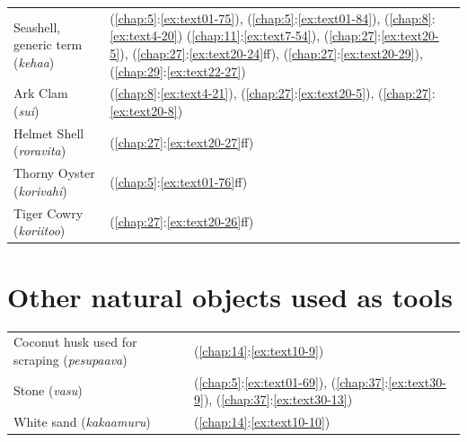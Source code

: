 \begin{tabularx}{\textwidth}{p{7cm}X}
    Seashell, generic term (\textit{kehaa})&(\ref{chap:5}:\ref{ex:text01-75}), (\ref{chap:5}:\ref{ex:text01-84}), (\ref{chap:8}:\ref{ex:text4-20}) (\ref{chap:11}:\ref{ex:text7-54}), (\ref{chap:27}:\ref{ex:text20-5}), (\ref{chap:27}:\ref{ex:text20-24}ff), (\ref{chap:27}:\ref{ex:text20-29}), (\ref{chap:29}:\ref{ex:text22-27})\\
    Ark Clam (\textit{sui})&(\ref{chap:8}:\ref{ex:text4-21}), (\ref{chap:27}:\ref{ex:text20-5}), (\ref{chap:27}:\ref{ex:text20-8})\\
    Helmet Shell (\textit{roravita})&(\ref{chap:27}:\ref{ex:text20-27}ff)\\
    Thorny Oyster (\textit{korivahi})&(\ref{chap:5}:\ref{ex:text01-76}ff)\\
    Tiger Cowry (\textit{koriitoo})&(\ref{chap:27}:\ref{ex:text20-26}ff)\\
\end{tabularx}

\section{Other natural objects used as tools}\label{ind:tools}

\begin{tabularx}{\textwidth}{p{7cm}X}
    Coconut husk used for scraping (\textit{pesupaava})&(\ref{chap:14}:\ref{ex:text10-9})\\
    Stone (\textit{vasu})&(\ref{chap:5}:\ref{ex:text01-69}), (\ref{chap:37}:\ref{ex:text30-9}), (\ref{chap:37}:\ref{ex:text30-13})\\
    White sand (\textit{kakaamuru})&(\ref{chap:14}:\ref{ex:text10-10})\\
\end{tabularx}